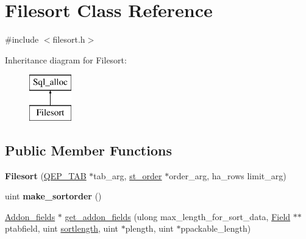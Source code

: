 \hypertarget{classFilesort}{}\section{Filesort Class Reference}
\label{classFilesort}


{\ttfamily \#include $<$filesort.\+h$>$}

Inheritance diagram for Filesort\+:\begin{figure}[H]
\begin{center}
\leavevmode
\includegraphics[height=2.000000cm]{classFilesort}
\end{center}
\end{figure}
\subsection*{Public Member Functions}
\begin{DoxyCompactItemize}
\item 
\mbox{\label{classFilesort_a7af75a334a989b13a37e76d5fa4987e2}} 
{\bfseries Filesort} (\mbox{\hyperlink{classQEP__TAB}{Q\+E\+P\+\_\+\+T\+AB}} $\ast$tab\+\_\+arg, \mbox{\hyperlink{structst__order}{st\+\_\+order}} $\ast$order\+\_\+arg, ha\+\_\+rows limit\+\_\+arg)
\item 
\mbox{\label{classFilesort_aca379f5e809620ea4517169c3cee18b5}} 
uint {\bfseries make\+\_\+sortorder} ()
\item 
\mbox{\hyperlink{classAddon__fields}{Addon\+\_\+fields}} $\ast$ \mbox{\hyperlink{classFilesort_a7b6a9829d340386a342405bcbd1f1fa1}{get\+\_\+addon\+\_\+fields}} (ulong max\+\_\+length\+\_\+for\+\_\+sort\+\_\+data, \mbox{\hyperlink{classField}{Field}} $\ast$$\ast$ptabfield, uint \mbox{\hyperlink{filesort_8cc_af2b02d8e944d1fc9ccaf16547453c156}{sortlength}}, uint $\ast$plength, uint $\ast$ppackable\+\_\+length)
\end{DoxyCompactItemize}
